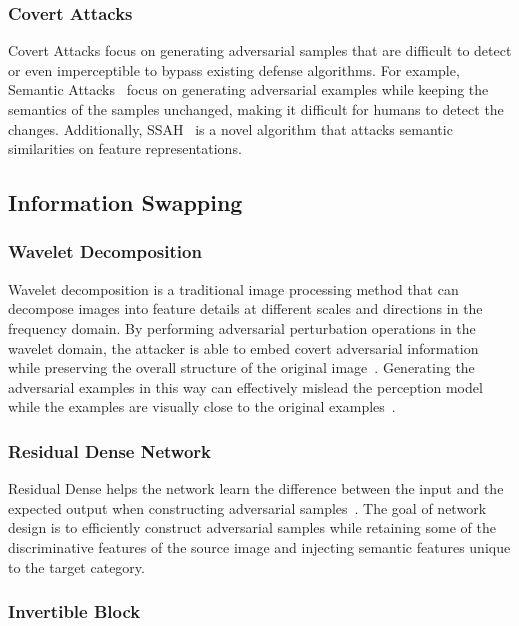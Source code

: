 \subsubsection{Covert Attacks}

Covert Attacks focus on generating adversarial samples that are difficult to detect or even imperceptible to bypass existing defense algorithms. For example, Semantic Attacks~\cite{joshi2019semantic} focus on generating adversarial examples while keeping the semantics of the samples unchanged, making it difficult for humans to detect the changes. Additionally, SSAH~\cite{luo2022frequency} is a novel algorithm that attacks semantic similarities on feature representations.

\subsection{Information Swapping}

\subsubsection{Wavelet Decomposition}

Wavelet decomposition is a traditional image processing method that can decompose images into feature details at different scales and directions in the frequency domain. By performing adversarial perturbation operations in the wavelet domain, the attacker is able to embed covert adversarial information while preserving the overall structure of the original image~\cite{yan2023wavelet}. Generating the adversarial examples in this way can effectively mislead the perception model while the examples are visually close to the original examples~\cite{luo2022frequency}.

\subsubsection{Residual Dense Network}

Residual Dense helps the network learn the difference between the input and the expected output when constructing adversarial samples~\cite{zhang2018residual}. The goal of network design is to efficiently construct adversarial samples while retaining some of the discriminative features of the source image and injecting semantic features unique to the target category.

\subsubsection{Invertible Block}

